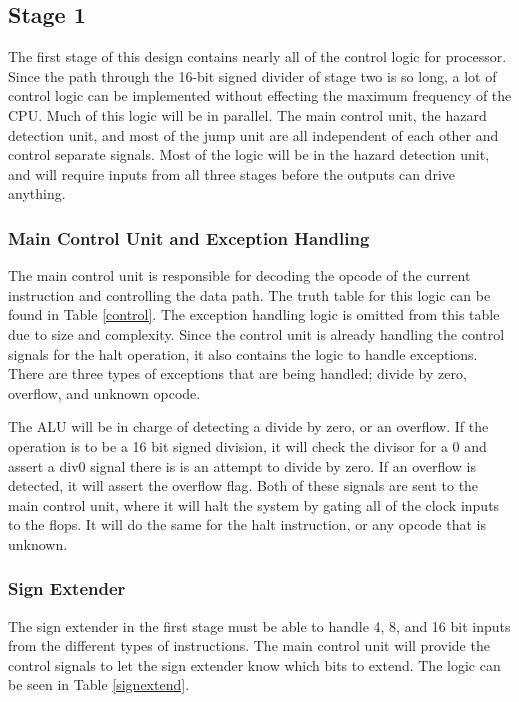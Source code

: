     \subsection{Stage 1}
    The first stage of this design contains nearly all of the control logic for processor. Since the path through
    the 16-bit signed divider of stage two is so long, a lot of control logic can be implemented without effecting
    the maximum frequency of the CPU. Much of this logic will be in parallel. The main control unit, the hazard detection unit, and most of the jump unit are all independent of each other and control separate signals. Most of the logic will be in the hazard detection unit, and will require inputs from all three stages before the outputs can drive anything. 
    
    
    \subsubsection{Main Control Unit and Exception Handling}
    The main control unit is responsible for decoding the opcode of the current instruction and controlling the data path. The truth table for this logic can be found in Table \ref{control}. The exception handling logic is omitted from this table due to size and complexity. Since the control unit is already handling the control signals for the halt operation, it also contains the logic to handle exceptions. There are three types of exceptions that are being handled; divide by zero, overflow, and unknown opcode.
    
    The ALU will be in charge of detecting a divide by zero, or an overflow. If the operation is to be a 16 bit signed division, it will check the divisor for a 0 and assert a div0 signal there is is an attempt to divide by zero. If an overflow is detected, it will assert the overflow flag. Both of these signals are sent to the main control unit, where it will halt the system by gating all of the clock inputs to the flops. It will do the same for the halt instruction, or any opcode that is unknown.
    
    \subsubsection{Sign Extender}
    The sign extender in the first stage must be able to handle 4, 8, and 16 bit inputs from the different types of instructions. The main control unit will provide the control signals to let the sign extender know which bits to extend. The logic can be seen in Table \ref{signextend}.
    
